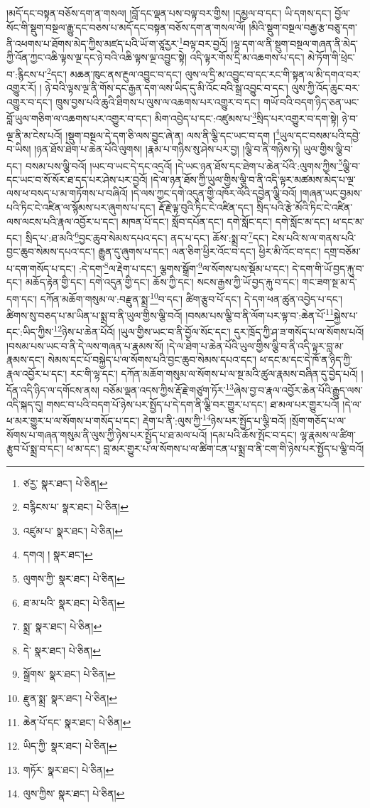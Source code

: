 །མདོ་དང་བསྟན་བཅོས་དག་ན་གསལ། །བློ་དང་ལྡན་པས་བལྟ་བར་གྱིས། །དམྱལ་བ་དང་། ཡི་དགས་དང་། བྱོལ་སོང་གི་སྡུག་བསྔལ་རྒྱུ་དང་བཅས་པ་མདོ་དང་བསྟན་བཅོས་དག་ན་གསལ་ལོ། །མིའི་སྡུག་བསྔལ་བརྒྱ་རྩ་བཅུ་དག་ནི་འཕགས་པ་ཐོགས་མེད་ཀྱིས་མཛད་པའི་ཡོ་ག་ཙཱརྱར་\footnote{ཙརྱ་  སྣར་ཐང་།  པེ་ཅིན། }བལྟ་བར་བྱའོ། །ལྷ་དག་ལ་ནི་སྡུག་བསྔལ་གཞན་ནི་མེད་ཀྱི་འོན་ཀྱང་འཆི་ལྟས་ལྔ་དང་ཉེ་བའི་འཆི་ལྟས་ལྔ་འབྱུང་སྟེ། འདི་ལྟར་གོས་དྲི་མ་འཆགས་པ་དང་། མེ་ཏོག་གི་ཕྲེང་བ་:རྙིངས་པ་\footnote{བརྙིངས་པ་  སྣར་ཐང་།  པེ་ཅིན། }དང་། མཆན་ཁུང་ནས་རྔུལ་འབྱུང་བ་དང་། ལུས་ལ་དྲི་མ་འབྱུང་བ་དང་རང་གི་སྟན་ལ་མི་དགའ་བར་འགྱུར་རོ། །
ཉེ་བའི་ལྟས་ལྔ་ནི་གོས་དང་རྒྱན་དག་ལས་ཡིད་དུ་མི་འོང་བའི་སྒྲ་འབྱུང་བ་དང་། ལུས་ཀྱི་འོད་ཆུང་བར་འགྱུར་བ་དང་། ཁྲུས་བྱས་པའི་ཆུའི་ཐིགས་པ་ལུས་ལ་འཆགས་པར་འགྱུར་བ་དང་། གཡོ་བའི་བདག་ཉིད་ཅན་ཡང་བློ་ཡུལ་གཅིག་ལ་འཆགས་པར་འགྱུར་བ་དང་། མིག་འབྱེད་པ་དང་:འཛུམས་པ་\footnote{འཛུམ་པ་  སྣར་ཐང་།  པེ་ཅིན། }སྲིད་པར་འགྱུར་བ་དག་སྟེ། ཉེ་བ་ལྔ་ནི་མ་ངེས་པའོ། །སྡུག་བསྔལ་དེ་དག་ཅི་ལས་བྱུང་ཞེ་ན། ལས་ནི་ལྕི་དང་ཡང་བ་དག །\footnote{དགའ། །  སྣར་ཐང་། }ཡུལ་དང་བསམ་པའི་དབྱེ་བ་ཡིས། །ཉན་ཐོས་ཐེག་པ་ཆེན་པོའི་ལུགས། །རྣམ་པ་གཉིས་སུ་ཤེས་པར་བྱ། །ལྕི་བ་ནི་གཉིས་ཏེ། ཡུལ་གྱིས་ལྕི་བ་དང་། བསམ་པས་ལྕི་བའོ། །ཡང་བ་ཡང་དེ་དང་འདྲའོ། །དེ་ཡང་ཉན་ཐོས་དང་ཐེག་པ་ཆེན་པོའི་:ལུགས་ཀྱིས་\footnote{ལུགས་ཀྱི་  སྣར་ཐང་།  པེ་ཅིན། }ལྕི་བ་དང་ཡང་བ་སོ་སོར་ཐ་དད་པར་ཤེས་པར་བྱའོ། །དེ་ལ་ཉན་ཐོས་ཀྱི་ཡུལ་གྱིས་ལྕི་བ་ནི་འདི་ལྟར་མཚམས་མེད་པ་ལྔ་ལས་ཕ་བསད་པ་མ་གཏོགས་པ་བཞིའོ། །དེ་ལས་ཀྱང་དགེ་འདུན་གྱི་འཁོར་ལོའི་དབྱེན་ལྕི་བའོ། །གཞན་ཡང་བྱམས་པའི་ཏིང་ངེ་འཛིན་ལ་སྙོམས་པར་ཞུགས་པ་དང་། རྡོ་རྗེ་ལྟ་བུའི་ཏིང་ངེ་འཛིན་དང་། སྲིད་པའི་རྩེ་མོའི་ཏིང་ངེ་འཛིན་ལས་ལངས་པའི་རྣལ་འབྱོར་པ་དང་། མཁན་པོ་དང་། སློབ་དཔོན་དང་། དགེ་སློང་དང་། དགེ་སློང་མ་དང་། ཕ་དང་མ་དང་། སྲིད་པ་:ཐ་མའི་\footnote{ཐ་མ་པའི་  སྣར་ཐང་།  པེ་ཅིན། }བྱང་ཆུབ་སེམས་དཔའ་དང་། ནད་པ་དང་། ཆོས་:སྨྲ་བ་\footnote{སྨྲ་  སྣར་ཐང་།  པེ་ཅིན། }དང་། ངེས་པའི་ས་ལ་གནས་པའི་བྱང་ཆུབ་སེམས་དཔའ་དང་། རྒྱུན་དུ་ཞུགས་པ་དང་། ལན་ཅིག་ཕྱིར་འོང་བ་དང་། ཕྱིར་མི་འོང་བ་དང་། དགྲ་བཅོམ་པ་དག་གསོད་པ་དང་། :དེ་དག་\footnote{དེ་  སྣར་ཐང་།  པེ་ཅིན། }ལ་རྡེག་པ་དང་། ལྕགས་སྒྲོག་\footnote{སྒྲོགས་  སྣར་ཐང་།  པེ་ཅིན། }ལ་སོགས་པས་སྡོམ་པ་དང་། དེ་དག་གི་ཡོ་བྱད་རྐུ་བ་དང་། མཆོད་རྟེན་གྱི་དང་། དགེ་འདུན་གྱི་དང་། ཆོས་ཀྱི་དང་། སངས་རྒྱས་ཀྱི་ཡོ་བྱད་རྐུ་བ་དང་། གང་ཟག་སྔ་མ་དེ་དག་དང་། དཀོན་མཆོག་གསུམ་ལ་:བརྫུན་སྨྲ་\footnote{རྫུན་སྨྲ་  སྣར་ཐང་།  པེ་ཅིན། }བ་དང་། ཚིག་རྩུབ་པོ་དང་། དེ་དག་ཕན་ཚུན་འབྱེད་པ་དང་། ཚིགས་སུ་བཅད་པ་མ་ཡིན་པ་སྨྲ་བ་ནི་ཡུལ་གྱིས་ལྕི་བའོ། །བསམ་པས་ལྕི་བ་ནི་ལོག་པར་ལྟ་བ་:ཆེན་པོ་\footnote{ཆེན་པོ་དང་  སྣར་ཐང་།  པེ་ཅིན། }སྐྱེས་པ་དང་:ཡིད་ཀྱིས་\footnote{ཡིད་ཀྱི་  སྣར་ཐང་།  པེ་ཅིན། }ཉེས་པ་ཆེན་པོའོ། །ཡུལ་གྱིས་ཡང་བ་ནི་བྱོལ་སོང་དང་། དུར་ཁྲོད་ཀྱི་ཤ་ཟ་གསོད་པ་ལ་སོགས་པའོ། །བསམ་པས་ཡང་བ་ནི་དེ་ལས་གཞན་པ་རྣམས་སོ། །དེ་ལ་ཐེག་པ་ཆེན་པོའི་ཡུལ་གྱིས་ལྕི་བ་ནི་འདི་ལྟར་བླ་མ་རྣམས་དང་། སེམས་དང་པོ་བསྐྱེད་པ་ལ་སོགས་པའི་བྱང་ཆུབ་སེམས་དཔའ་དང་། ཕ་དང་མ་དང་དེ་ཁོ་ན་ཉིད་ཀྱི་རྣལ་འབྱོར་པ་དང་། རང་གི་ལྷ་དང་། དཀོན་མཆོག་གསུམ་ལ་སོགས་པ་ལ་སྔ་མའི་ཚུལ་རྣམས་བཞིན་དུ་བྱེད་པའོ། །དོན་འདི་ཉིད་ལ་དགོངས་ནས། བཅོམ་ལྡན་འདས་ཀྱིས་རྡོ་རྗེ་གཙུག་ཏོར་\footnote{གཏོར་  སྣར་ཐང་།  པེ་ཅིན། }ཞེས་བྱ་བ་རྣལ་འབྱོར་ཆེན་པོའི་རྒྱུད་ལས་འདི་སྐད་དུ། གསང་བ་པའི་བདག་པོ་ཉེས་པར་སྤྱོད་པ་དེ་དག་ནི་ལྕི་བར་གྱུར་པ་དང་། ཐ་མལ་པར་གྱུར་པའོ། །དེ་ལ་ཕ་མར་གྱུར་པ་ལ་སོགས་པ་གསོད་པ་དང་། རྡེག་པ་ནི་:ལུས་ཀྱི་\footnote{ལུས་ཀྱིས་  སྣར་ཐང་།  པེ་ཅིན། }ཉེས་པར་སྤྱོད་པ་ལྕི་བའོ། །སྲོག་གཅོད་པ་ལ་སོགས་པ་གཞན་གསུམ་ནི་ལུས་ཀྱི་ཉེས་པར་སྤྱོད་པ་ཐ་མལ་པའོ། །དམ་པའི་ཆོས་སྤོང་བ་དང་། ལྷ་རྣམས་ལ་ཚིག་རྩུབ་པོ་སྨྲ་བ་དང་། ཕ་མ་དང་། བླ་མར་གྱུར་པ་ལ་སོགས་པ་ལ་ཚིག་ངན་པ་སྨྲ་བ་ནི་ངག་གི་ཉེས་པར་སྤྱོད་པ་ལྕི་བའོ། 